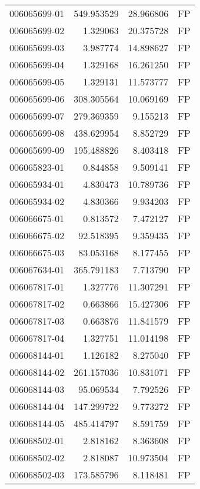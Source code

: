 \begin{tabular}{lrrl}
006065699-01 &  549.953529 &      28.966806 &   FP \\
006065699-02 &    1.329063 &      20.375728 &   FP \\
006065699-03 &    3.987774 &      14.898627 &   FP \\
006065699-04 &    1.329168 &      16.261250 &   FP \\
006065699-05 &    1.329131 &      11.573777 &   FP \\
006065699-06 &  308.305564 &      10.069169 &   FP \\
006065699-07 &  279.369359 &       9.155213 &   FP \\
006065699-08 &  438.629954 &       8.852729 &   FP \\
006065699-09 &  195.488826 &       8.403418 &   FP \\
006065823-01 &    0.844858 &       9.509141 &   FP \\
006065934-01 &    4.830473 &      10.789736 &   FP \\
006065934-02 &    4.830366 &       9.934203 &   FP \\
006066675-01 &    0.813572 &       7.472127 &   FP \\
006066675-02 &   92.518395 &       9.359435 &   FP \\
006066675-03 &   83.053168 &       8.177455 &   FP \\
006067634-01 &  365.791183 &       7.713790 &   FP \\
006067817-01 &    1.327776 &      11.307291 &   FP \\
006067817-02 &    0.663866 &      15.427306 &   FP \\
006067817-03 &    0.663876 &      11.841579 &   FP \\
006067817-04 &    1.327751 &      11.014198 &   FP \\
006068144-01 &    1.126182 &       8.275040 &   FP \\
006068144-02 &  261.157036 &      10.831071 &   FP \\
006068144-03 &   95.069534 &       7.792526 &   FP \\
006068144-04 &  147.299722 &       9.773272 &   FP \\
006068144-05 &  485.414797 &       8.591759 &   FP \\
006068502-01 &    2.818162 &       8.363608 &   FP \\
006068502-02 &    2.818087 &      10.973504 &   FP \\
006068502-03 &  173.585796 &       8.118481 &   FP \\

\end{tabular}
